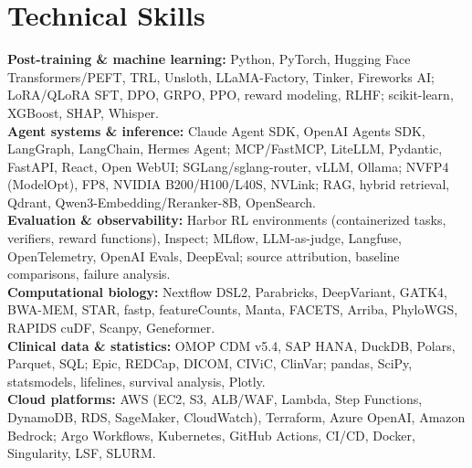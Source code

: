 \documentclass[letterpaper,11pt]{article}
\begin{document}
\section{Technical Skills}
\begingroup
\linespread{1}\fontsize{10.2}{11.6}\selectfont
\textbf{Post-training \& machine learning:} Python, PyTorch, Hugging Face Transformers/PEFT, TRL, Unsloth, LLaMA-Factory,
Tinker, Fireworks AI; LoRA/QLoRA SFT, DPO, GRPO, PPO, reward modeling, RLHF; scikit-learn, XGBoost, SHAP, Whisper.\\[2pt]
\textbf{Agent systems \& inference:} Claude Agent SDK, OpenAI Agents SDK, LangGraph, LangChain, Hermes Agent;
MCP/FastMCP, LiteLLM, Pydantic, FastAPI, React, Open WebUI; SGLang/sglang-router, vLLM, Ollama; NVFP4 (ModelOpt), FP8,
NVIDIA B200/H100/L40S, NVLink; RAG, hybrid retrieval, Qdrant, Qwen3-Embedding/Reranker-8B, OpenSearch.\\[2pt]
\textbf{Evaluation \& observability:} Harbor RL environments (containerized tasks, verifiers, reward functions), Inspect;
MLflow, LLM-as-judge, Langfuse, OpenTelemetry, OpenAI Evals, DeepEval; source attribution, baseline comparisons, failure analysis.\\[2pt]
\textbf{Computational biology:} Nextflow DSL2, Parabricks, DeepVariant, GATK4, BWA-MEM, STAR, fastp, featureCounts,
Manta, FACETS, Arriba, PhyloWGS, RAPIDS cuDF, Scanpy, Geneformer.\\[2pt]
\textbf{Clinical data \& statistics:} OMOP CDM v5.4, SAP HANA, DuckDB, Polars, Parquet, SQL; Epic, REDCap, DICOM,
CIViC, ClinVar; pandas, SciPy, statsmodels, lifelines, survival analysis, Plotly.\\[2pt]
\textbf{Cloud platforms:} AWS (EC2, S3, ALB/WAF, Lambda, Step Functions, DynamoDB, RDS,
SageMaker, CloudWatch), Terraform, Azure OpenAI, Amazon Bedrock; Argo Workflows, Kubernetes, GitHub Actions, CI/CD,
Docker, Singularity, LSF, SLURM.
\par\endgroup
\end{document}
